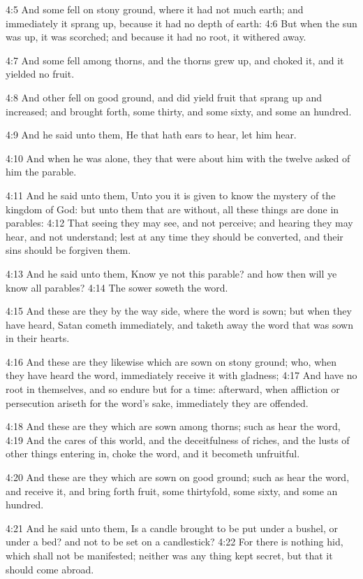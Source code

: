 4:5 And some fell on stony ground, where it had not much earth; and immediately it sprang up, because it had no depth of earth: 4:6 But when the sun was up, it was scorched; and because it had no root, it withered away.

4:7 And some fell among thorns, and the thorns grew up, and choked it, and it yielded no fruit.

4:8 And other fell on good ground, and did yield fruit that sprang up and increased; and brought forth, some thirty, and some sixty, and some an hundred.

4:9 And he said unto them, He that hath ears to hear, let him hear.

4:10 And when he was alone, they that were about him with the twelve asked of him the parable.

4:11 And he said unto them, Unto you it is given to know the mystery of the kingdom of God: but unto them that are without, all these things are done in parables: 4:12 That seeing they may see, and not perceive; and hearing they may hear, and not understand; lest at any time they should be converted, and their sins should be forgiven them.

4:13 And he said unto them, Know ye not this parable? and how then will ye know all parables?  4:14 The sower soweth the word.

4:15 And these are they by the way side, where the word is sown; but when they have heard, Satan cometh immediately, and taketh away the word that was sown in their hearts.

4:16 And these are they likewise which are sown on stony ground; who, when they have heard the word, immediately receive it with gladness; 4:17 And have no root in themselves, and so endure but for a time: afterward, when affliction or persecution ariseth for the word's sake, immediately they are offended.

4:18 And these are they which are sown among thorns; such as hear the word, 4:19 And the cares of this world, and the deceitfulness of riches, and the lusts of other things entering in, choke the word, and it becometh unfruitful.

4:20 And these are they which are sown on good ground; such as hear the word, and receive it, and bring forth fruit, some thirtyfold, some sixty, and some an hundred.

4:21 And he said unto them, Is a candle brought to be put under a bushel, or under a bed? and not to be set on a candlestick?  4:22 For there is nothing hid, which shall not be manifested; neither was any thing kept secret, but that it should come abroad.

